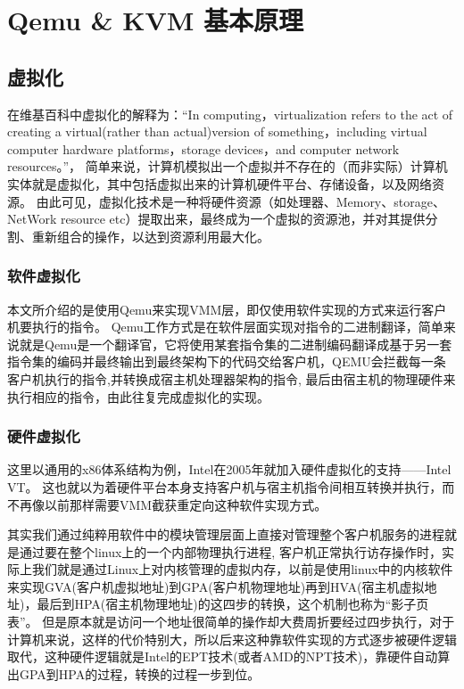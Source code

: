 \section{Qemu \& KVM 基本原理}
\subsection{虚拟化}
在维基百科中虚拟化的解释为：“In computing，virtualization refers to the act of creating a virtual(rather than actual)version of something，including virtual computer hardware platforms，storage devices，and computer network resources。”\cite{Wikipedia_Virtualization}， 
简单来说，计算机模拟出一个虚拟并不存在的（而非实际）计算机实体就是虚拟化，其中包括虚拟出来的计算机硬件平台、存储设备，以及网络资源。
由此可见，虚拟化技术是一种将硬件资源（如处理器、Memory、storage、NetWork resource etc）提取出来，最终成为一个虚拟的资源池，并对其提供分割、重新组合的操作，以达到资源利用最大化。

\subsubsection{软件虚拟化}
本文所介绍的是使用Qemu来实现VMM层，即仅使用软件实现的方式来运行客户机要执行的指令。
Qemu工作方式是在软件层面实现对指令的二进制翻译，简单来说就是Qemu是一个翻译官，它将使用某套指令集的二进制编码翻译成基于另一套指令集的编码并最终输出到最终架构下的代码交给客户机，QEMU会拦截每一条客户机执行的指令,并转换成宿主机处理器架构的指令,
最后由宿主机的物理硬件来执行相应的指令，由此往复完成虚拟化的实现。

\subsubsection{硬件虚拟化}
这里以通用的x86体系结构为例，Intel在2005年就加入硬件虚拟化的支持——Intel VT。
这也就以为着硬件平台本身支持客户机与宿主机指令间相互转换并执行，而不再像以前那样需要VMM截获重定向这种软件实现方式。

其实我们通过纯粹用软件中的模块管理层面上直接对管理整个客户机服务的进程就是通过要在整个linux上的一个内部物理执行进程,
客户机正常执行访存操作时，实际上我们就是通过Linux上对内核管理的虚拟内存，以前是使用linux中的内核软件来实现GVA(客户机虚拟地址)到GPA(客户机物理地址)再到HVA(宿主机虚拟地址)，最后到HPA(宿主机物理地址)的这四步的转换，这个机制也称为“影子页表”。
但是原本就是访问一个地址很简单的操作却大费周折要经过四步执行，对于计算机来说，这样的代价特别大，所以后来这种靠软件实现的方式逐步被硬件逻辑取代，这种硬件逻辑就是Intel的EPT技术(或者AMD的NPT技术)，靠硬件自动算出GPA到HPA的过程，转换的过程一步到位。

